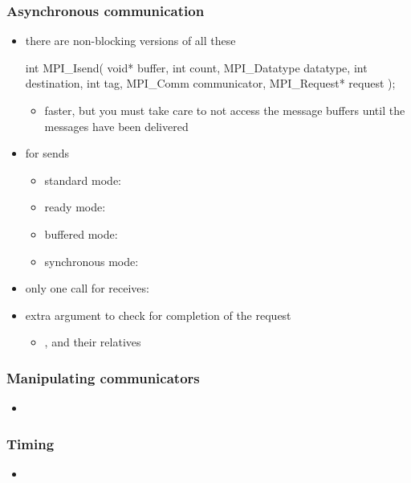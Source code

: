 \begin{frame}[fragile]
%
  \frametitle{Asynchronous communication}
%
  \begin{itemize}
%
  \item there are non-blocking versions of all these
    \begin{C}
int MPI_Isend(
        void* buffer, int count, MPI_Datatype datatype,
        int destination, int tag, 
        MPI_Comm communicator, MPI_Request* request
        );
    \end{C}
    \begin{itemize}
    \item faster, but you must take care to not access the message buffers until the messages
      have been delivered
    \end{itemize}
%
  \item for sends
    \begin{itemize}
    \item standard mode: 
    \item ready mode: 
    \item buffered mode: 
    \item synchronous mode: 
    \end{itemize}
%
  \item only one call for receives: 
%
  \item extra  argument to check for completion of the request
    \begin{itemize}
    \item {},  and their relatives
    \end{itemize}
%
  \end{itemize}
%
\end{frame}

\begin{frame}[fragile]
%
  \frametitle{Manipulating communicators}
%
  \begin{itemize}
%
  \item 
%
  \end{itemize}
%
\end{frame}

\begin{frame}[fragile]
%
  \frametitle{Timing}
%
  \begin{itemize}
%
  \item 
%
  \end{itemize}
%
\end{frame}

